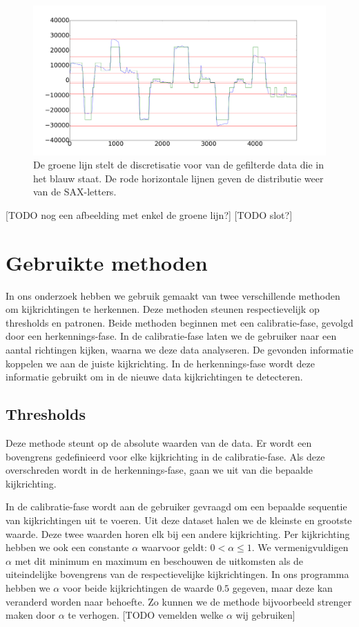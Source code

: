 \documentclass{article}
\begin{document}
\begin{figure}[h]
\centering
\includegraphics[width=\linewidth]{images/discretized_data}
\caption{De groene lijn stelt de discretisatie voor van de gefilterde data die in het blauw staat. De rode horizontale lijnen geven de distributie weer van de SAX-letters.}
\end{figure}

[TODO nog een afbeelding met enkel de groene lijn?]
[TODO slot?]

\section{Gebruikte methoden}

In ons onderzoek hebben we gebruik gemaakt van twee verschillende methoden om kijkrichtingen te herkennen. Deze methoden steunen respectievelijk op thresholds en patronen. Beide methoden beginnen met een calibratie-fase, gevolgd door een herkennings-fase. In de calibratie-fase laten we de gebruiker naar een aantal richtingen kijken, waarna we deze data analyseren. De gevonden informatie koppelen we aan de juiste kijkrichting. In de herkennings-fase wordt deze informatie gebruikt om in de nieuwe data kijkrichtingen te detecteren.

\subsection{Thresholds}

Deze methode steunt op de absolute waarden van de data. Er wordt een bovengrens gedefinieerd voor elke kijkrichting in de calibratie-fase. Als deze overschreden wordt in de herkennings-fase, gaan we uit van die bepaalde kijkrichting.

In de calibratie-fase wordt aan de gebruiker gevraagd om een bepaalde sequentie van kijkrichtingen uit te voeren. Uit deze dataset halen we de kleinste en grootste waarde. Deze twee waarden horen elk bij een andere kijkrichting. Per kijkrichting hebben we ook een constante $\alpha$ waarvoor geldt: $0 < \alpha \leq 1$. We vermenigvuldigen $\alpha$ met dit minimum en maximum en beschouwen de uitkomsten als de uiteindelijke bovengrens van de respectievelijke kijkrichtingen. In ons programma hebben we $\alpha$ voor beide kijkrichtingen de waarde $0.5$ gegeven, maar deze kan veranderd worden naar behoefte. Zo kunnen we de methode bijvoorbeeld strenger maken door $\alpha$ te verhogen. [TODO vemelden welke $\alpha$ wij gebruiken]
\end{document}

